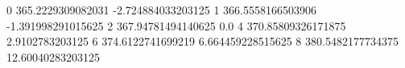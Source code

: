 0 365.2229309082031 -2.724884033203125
1 366.5558166503906 -1.391998291015625
2 367.94781494140625 0.0
4 370.85809326171875 2.9102783203125
6 374.6122741699219 6.664459228515625
8 380.5482177734375 12.60040283203125

